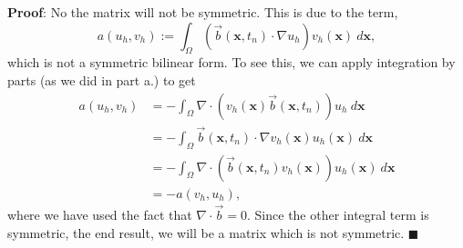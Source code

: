 \documentclass[11pt]{article}
\newcommand{\bs}{\boldsymbol}
\begin{document}
\textbf{Proof}: No the matrix will not be symmetric.
This is due to the term,
\begin{equation*}
    a(u_h, v_h) := \int_\Omega (\Vec{b}(\bs{x},t_n) \cdot \nabla u_h) v_h(\bs{x}) \: d\bs{x},
\end{equation*}
which is not a symmetric bilinear form.
To see this, we can apply integration by parts (as we did in part a.) to get
\begin{align*}
	a(u_h, v_h) &= -\int_\Omega \nabla \cdot (v_h(\bs{x}) \Vec{b}(\bs{x},t_n) ) u_h \: d\bs{x} \\
	&= -\int_\Omega \Vec{b}(\bs{x},t_n) \cdot \nabla v_h(\bs{x}) u_h(\bs{x}) \: d\bs{x} \\
	&= -\int_\Omega \nabla \cdot (\Vec{b}(\bs{x},t_n) v_h(\bs{x})) u_h(\bs{x}) \: d\bs{x} \\
	&= -a(v_h, u_h),
\end{align*}
where we have used the fact that $\nabla \cdot \Vec{b} = 0$.
Since the other integral term is symmetric, the end result, we will be a matrix which is not symmetric.
$\blacksquare$


\vskip 2cm
\end{document}
